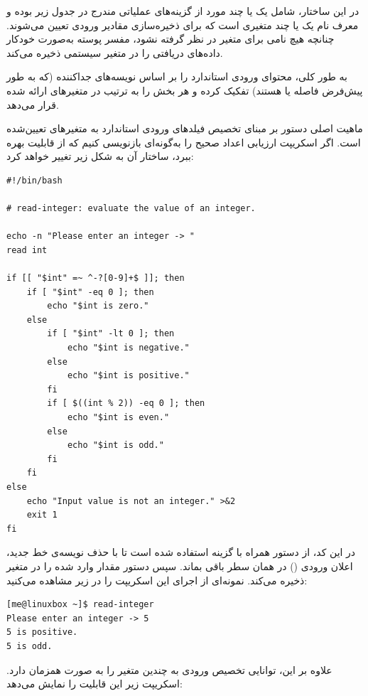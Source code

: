 در این ساختار،  شامل یک یا چند مورد از گزینه‌های عملیاتی مندرج در جدول زیر بوده و  معرف نام یک یا چند متغیری است که برای ذخیره‌سازی مقادیر ورودی تعیین می‌شوند. چنانچه هیچ نامی برای متغیر در نظر گرفته نشود، مفسر پوسته به‌صورت خودکار داده‌های دریافتی را در متغیر سیستمی  ذخیره می‌کند.

به طور کلی،  محتوای ورودی استاندارد را بر اساس نویسه‌های جداکننده (که به طور پیش‌فرض فاصله یا  هستند) تفکیک کرده و هر بخش را به ترتیب در متغیرهای ارائه شده قرار می‌دهد.

ماهیت اصلی دستور  بر مبنای تخصیص فیلدهای ورودی استاندارد به متغیرهای تعیین‌شده است. اگر اسکریپت ارزیابی اعداد صحیح را به‌گونه‌ای بازنویسی کنیم که از قابلیت  بهره ببرد، ساختار آن به شکل زیر تغییر خواهد کرد:

\begin{latin}
\begin{lstlisting}
#!/bin/bash

# read-integer: evaluate the value of an integer.

echo -n "Please enter an integer -> "
read int

if [[ "$int" =~ ^-?[0-9]+$ ]]; then
    if [ "$int" -eq 0 ]; then
        echo "$int is zero."
    else
        if [ "$int" -lt 0 ]; then
            echo "$int is negative."
        else
            echo "$int is positive."
        fi
        if [ $((int % 2)) -eq 0 ]; then
            echo "$int is even."
        else
            echo "$int is odd."
        fi
    fi
else
    echo "Input value is not an integer." >&2
    exit 1
fi
\end{lstlisting}
\end{latin}

در این کد، از دستور  همراه با گزینه  استفاده شده است تا با حذف نویسه‌ی خط جدید، اعلان ورودی () در همان سطر باقی بماند. سپس دستور  مقدار وارد شده را در متغیر  ذخیره می‌کند. نمونه‌ای از اجرای این اسکریپت را در زیر مشاهده می‌کنید:

\begin{latin}
\begin{lstlisting}
[me@linuxbox ~]$ read-integer
Please enter an integer -> 5
5 is positive.
5 is odd.
\end{lstlisting}
\end{latin}

علاوه بر این،  توانایی تخصیص ورودی به چندین متغیر را به صورت همزمان دارد. اسکریپت زیر این قابلیت را نمایش می‌دهد:

